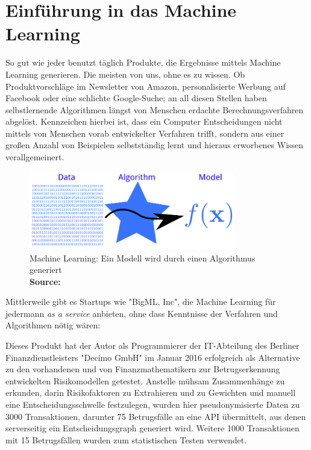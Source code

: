 \documentclass[runningheads,a4paper]{llncs}
\newcommand*{\captionsource}[2]{%
  \caption[{#1}]{%
    #1%
    \\\hspace{\linewidth}%
    \textbf{Source:} #2%
  }%
}
\begin{document}
\section{Einführung in das Machine Learning}\label{sec:intro}

So gut wie jeder benutzt täglich Produkte, die Ergebnisse mittels Machine Learning generieren. Die meisten von uns, ohne es zu wissen. Ob Produktvorschläge im Newsletter von Amazon, personalisierte Werbung auf Facebook oder eine schlichte Google-Suche; an all diesen Stellen haben selbstlernende Algorithmen längst von Menschen erdachte Berechnungsverfahren abgelöst\cite{Coursera}. Kennzeichen hierbei ist, dass ein Computer Entscheidungen nicht mittels von Menschen vorab entwickelter Verfahren trifft, sondern aus einer großen Anzahl von Beispielen selbstständig lernt und hieraus erworbenes Wissen verallgemeinert.\cite{wiki:Machine_learning}


\begin{figure} [ht]
  \centering
  \includegraphics[width=0.8\textwidth]{res/ml-900.png}
      \captionsource{Machine Learning: Ein Modell wird durch einen Algorithmus generiert}{\cite{Phili47:online}}

  \label{fig:overview}
\end{figure}

Mittlerweile gibt es Startups wie "BigML, Inc", die Machine Learning für jedermann \emph{as a service} anbieten, ohne dass Kenntnisse der Verfahren und Algorithmen nötig wären: \cite{BigML33:online}

Dieses Produkt hat der Autor als Programmierer der IT-Abteilung des Berliner Finanzdienstleisters "Decimo GmbH" im Januar 2016 erfolgreich als Alternative zu den vorhandenen und von Finanzmathematikern zur Betrugserkennung entwickelten Risikomodellen getestet. Anstelle mühsam Zusammenhänge zu erkunden, darin Risikofaktoren zu Extrahieren und zu Gewichten und manuell eine Entscheidungsschwelle festzulegen, wurden hier pseudonymisierte Daten zu 3000 Transaktionen, darunter 75 Betrugsfälle an eine API übermittelt, aus denen serverseitig ein Entscheidungsgraph generiert wird. Weitere 1000 Transaktionen mit 15 Betrugsfällen wurden zum statistischen Testen verwendet.
\end{document}
